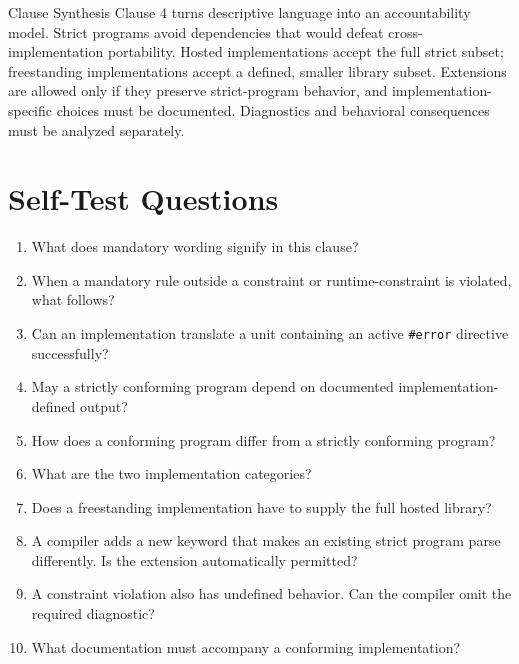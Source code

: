 \documentclass[10pt,letterpaper]{article}
\begin{document}
\begin{CornellSummaryBox}{Clause Synthesis}
Clause 4 turns descriptive language into an accountability model. Strict programs avoid dependencies that would defeat cross-implementation portability. Hosted implementations accept the full strict subset; freestanding implementations accept a defined, smaller library subset. Extensions are allowed only if they preserve strict-program behavior, and implementation-specific choices must be documented. Diagnostics and behavioral consequences must be analyzed separately.
\end{CornellSummaryBox}



\clearpage
\section{Self-Test Questions}
\begin{enumerate}
  \item What does mandatory wording signify in this clause?
  \item When a mandatory rule outside a constraint or runtime-constraint is violated, what follows?
  \item Can an implementation translate a unit containing an active \texttt{\#error} directive successfully?
  \item May a strictly conforming program depend on documented implementation-defined output?
  \item How does a conforming program differ from a strictly conforming program?
  \item What are the two implementation categories?
  \item Does a freestanding implementation have to supply the full hosted library?
  \item A compiler adds a new keyword that makes an existing strict program parse differently. Is the extension automatically permitted?
  \item A constraint violation also has undefined behavior. Can the compiler omit the required diagnostic?
  \item What documentation must accompany a conforming implementation?
\end{enumerate}

\clearpage
\end{document}

